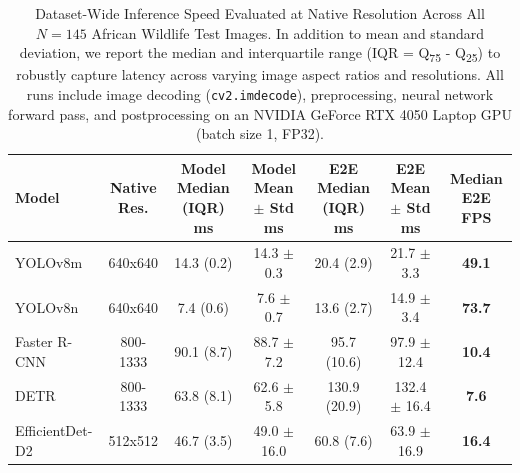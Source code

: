 \begin{table}[htbp]
\centering
\caption{Dataset-Wide Inference Speed Evaluated at Native Resolution Across All $N=145$ African Wildlife Test Images. In addition to mean and standard deviation, we report the median and interquartile range (IQR = Q\textsubscript{75} - Q\textsubscript{25}) to robustly capture latency across varying image aspect ratios and resolutions. All runs include image decoding (\texttt{cv2.imdecode}), preprocessing, neural network forward pass, and postprocessing on an NVIDIA GeForce RTX 4050 Laptop GPU (batch size 1, FP32).}
\label{tab:dataset_speed_median_iqr}
\small
\renewcommand{\arraystretch}{1.2}
\begin{tabular}{lcccccc}
\toprule
\textbf{Model} & \textbf{Native Res.} & \textbf{Model Median (IQR) ms} & \textbf{Model Mean $\pm$ Std ms} & \textbf{E2E Median (IQR) ms} & \textbf{E2E Mean $\pm$ Std ms} & \textbf{Median E2E FPS} \\
\midrule
YOLOv8m & 640x640 & 14.3 (0.2) & 14.3 $\pm$ 0.3 & 20.4 (2.9) & 21.7 $\pm$ 3.3 & \textbf{49.1} \\
YOLOv8n & 640x640 & 7.4 (0.6) & 7.6 $\pm$ 0.7 & 13.6 (2.7) & 14.9 $\pm$ 3.4 & \textbf{73.7} \\
Faster R-CNN & 800-1333 & 90.1 (8.7) & 88.7 $\pm$ 7.2 & 95.7 (10.6) & 97.9 $\pm$ 12.4 & \textbf{10.4} \\
DETR & 800-1333 & 63.8 (8.1) & 62.6 $\pm$ 5.8 & 130.9 (20.9) & 132.4 $\pm$ 16.4 & \textbf{7.6} \\
EfficientDet-D2 & 512x512 & 46.7 (3.5) & 49.0 $\pm$ 16.0 & 60.8 (7.6) & 63.9 $\pm$ 16.9 & \textbf{16.4} \\
\bottomrule
\end{tabular}
\end{table}
